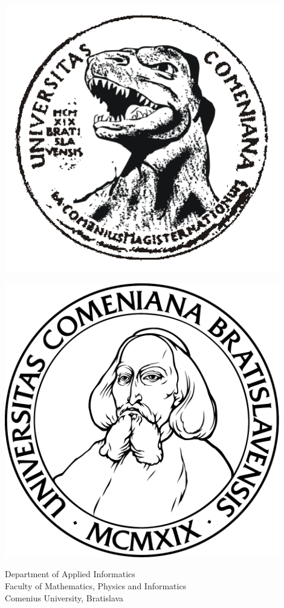 \documentclass[a4paper,12pt,oneside,openany]{book}
\begin{document}
\frontmatter
\thispagestyle{empty}

\ifdefined\godzilla
  \begin{minipage}{0.20\textwidth}
  \includegraphics[width=0.9\textwidth]{img/godzilla}
  \end{minipage}
\else
  \begin{minipage}{0.20\textwidth}
  \includegraphics[width=0.9\textwidth]{img/comenius_new}
  \end{minipage}
\fi
\begin{minipage}{0.79\textwidth}
\begin{center}
\sc Department of Applied Informatics \\
Faculty of Mathematics, Physics and Informatics \\
Comenius University, Bratislava
\end{center}
\end{minipage}
\end{document}
